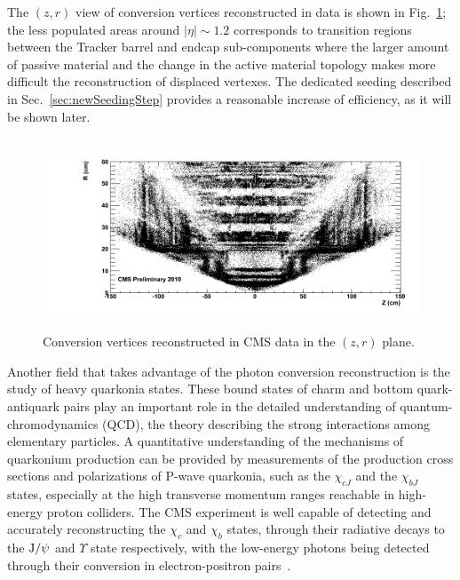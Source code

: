 \documentclass[a4paper]{jpconf}
\def \JPsi{\rm J/\psi}
\begin{document}
%
The  $(z, r)$  view of conversion vertices reconstructed in data is  shown in Fig.~\ref{fig:convRZ};  the less populated
areas  around $|\eta|\sim1.2$ corresponds to transition regions between the Tracker
barrel and endcap sub-components where the larger amount of passive material and the change in the active material topology makes more difficult the reconstruction of displaced vertexes. 
The dedicated seeding described in Sec.~\ref{sec:newSeedingStep} provides a reasonable increase of efficiency, as it will be shown later.


\begin{figure}[h!]
  \begin{center}
     \includegraphics[width=17cm,height=5.7cm]{fig/conversions/ptCut/data_rz.png}
      \caption{Conversion vertices reconstructed in CMS data in the $(z,r)$ plane.}
    \label{fig:convRZ}
  \end{center}
\end{figure}



Another field that takes advantage of the photon conversion reconstruction is the study of heavy quarkonia states. These bound states of charm and bottom quark-antiquark pairs play an important role in the detailed understanding of quantum-chromodynamics 
(QCD), the theory describing the strong interactions among elementary particles. 
A quantitative understanding of the mechanisms of quarkonium production can
be provided by measurements of the production cross sections and 
polarizations of P-wave quarkonia, such as the $\chi_{cJ}$ and the 
$\chi_{bJ}$ states, especially at the high transverse momentum ranges
reachable in high-energy proton colliders.
The CMS experiment is well capable 
of detecting and accurately reconstructing the $\chi_{c}$ and $\chi_{b}$
states, through their radiative decays to the $\JPsi$ and $\Upsilon$
state respectively, with the low-energy photons being detected through their conversion 
in electron-positron pairs~\cite{chic}. 
\end{document}

